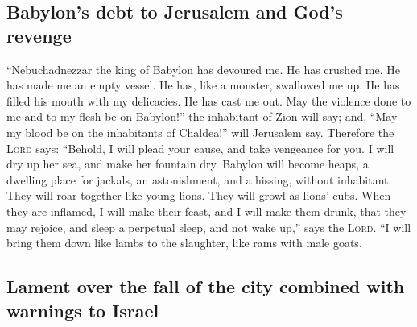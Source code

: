\hypertarget{babylons-debt-to-jerusalem-and-gods-revenge}{%
\subsection{Babylon's debt to Jerusalem and God's
revenge}\label{babylons-debt-to-jerusalem-and-gods-revenge}}

 ``Nebuchadnezzar the king of Babylon has devoured me. He
has crushed me. He has made me an empty vessel. He has, like a monster,
swallowed me up. He has filled his mouth with my delicacies. He has cast
me out.  May the violence done to me and to my flesh be
on Babylon!'' the inhabitant of Zion will say; and, ``May my blood be on
the inhabitants of Chaldea!'' will Jerusalem say. 
Therefore the \textsc{Lord} says: ``Behold, I will plead your cause, and
take vengeance for you. I will dry up her sea, and make her fountain
dry.  Babylon will become heaps, a dwelling place for
jackals, an astonishment, and a hissing, without inhabitant.
 They will roar together like young lions. They will
growl as lions' cubs.  When they are inflamed, I will
make their feast, and I will make them drunk, that they may rejoice, and
sleep a perpetual sleep, and not wake up,'' says the \textsc{Lord}.
 ``I will bring them down like lambs to the slaughter,
like rams with male goats.

\hypertarget{lament-over-the-fall-of-the-city-combined-with-warnings-to-israel}{%
\subsection{Lament over the fall of the city combined with warnings to
Israel}\label{lament-over-the-fall-of-the-city-combined-with-warnings-to-israel}}

